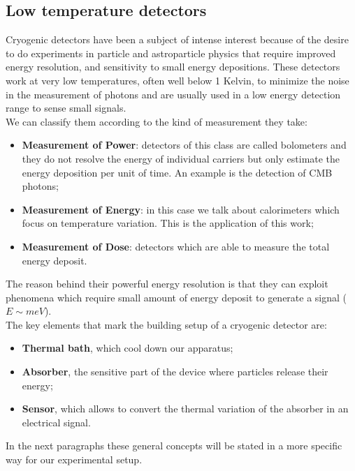 \documentclass[12pt]{article}
\begin{document}
\subsection{Low temperature detectors}
Cryogenic detectors have been a subject of intense interest because of the desire to do experiments in particle and astroparticle physics that require improved energy resolution, and sensitivity to small energy depositions. These detectors work at very low temperatures, often well below 1 Kelvin, to minimize the noise in the measurement of photons and are usually used in a low energy detection range to sense small signals.\\
We can classify them according to the kind of measurement they take:
\begin{itemize}
    \item \textbf{Measurement of Power}: detectors of this class are called bolometers and they do not resolve the energy of individual carriers but only estimate the energy deposition per unit of time. An example is the detection of CMB photons;
    \item \textbf{Measurement of Energy}: in this case we talk about calorimeters which focus on temperature variation. This is the application of this work;
    \item \textbf{Measurement of Dose}: detectors which are able to measure the total energy deposit.
\end{itemize}
The reason behind their powerful energy resolution is that they can exploit phenomena which require small amount of energy deposit to generate a signal ($E\sim meV$).\\
The key elements that mark the building setup of a cryogenic detector are:
\begin{itemize}
    \item \textbf{Thermal bath}, which cool down our apparatus;
    \item \textbf{Absorber}, the sensitive part of the device where particles release their energy;
    \item \textbf{Sensor}, which allows to convert the thermal variation of the absorber in an electrical signal.
\end{itemize}
In the next paragraphs these general concepts will be stated in a more specific way for our experimental setup.
\end{document}
